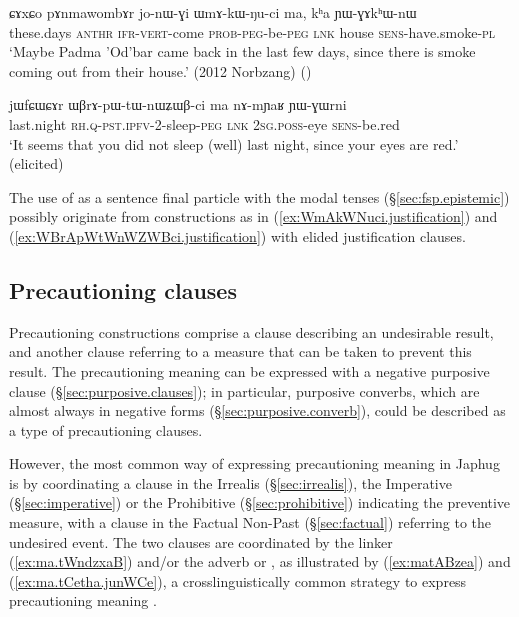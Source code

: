 \begin{exe}
\ex \label{ex:WmAkWNuci.justification}
 \gll ɕɤxɕo pɤnmawombɤr jo-nɯ-ɣi ɯmɤ-kɯ-ŋu-ci ma, kʰa ɲɯ-ɣɤkʰɯ-nɯ \\
these.days  \textsc{anthr} \textsc{ifr}-\textsc{vert}-come \textsc{prob}-\textsc{peg}-be-\textsc{peg} \textsc{lnk} house \textsc{sens}-have.smoke-\textsc{pl} \\
\glt `Maybe Padma 'Od'bar came back in the last few days, since there is smoke coming out from their house.' (2012 Norbzang)
()
\end{exe} 

 \begin{exe}
\ex \label{ex:WBrApWtWnWZWBci.justification}
 \gll  jɯfɕɯɕɤr ɯβrɤ-pɯ-tɯ-nɯʑɯβ-ci ma nɤ-mɲaʁ ɲɯ-ɣɯrni \\
 last.night \textsc{rh}.\textsc{q}-\textsc{pst}.\textsc{ipfv}-2-sleep-\textsc{peg} \textsc{lnk} \textsc{2sg}.\textsc{poss}-eye \textsc{sens}-be.red \\
 \glt `It seems that you did not sleep (well) last night, since your eyes are red.' (elicited)
\end{exe} 

 The use of  as a sentence final particle with the modal tenses (§\ref{sec:fsp.epistemic}) possibly originate from constructions as in (\ref{ex:WmAkWNuci.justification}) and (\ref{ex:WBrApWtWnWZWBci.justification}) with elided justification clauses.
 
\subsection{Precautioning clauses} \label{sec:precautioning.clauses} 
Precautioning constructions comprise a clause describing an undesirable result, and another clause referring to a measure that can be taken to prevent this result. The precautioning meaning can be expressed with a negative purposive clause (§\ref{sec:purposive.clauses}); in particular, purposive converbs, which are almost always in negative forms (§\ref{sec:purposive.converb}), could be described as a type of precautioning clauses.

However, the most common way of expressing precautioning meaning in Japhug is by coordinating a clause in the Irrealis (§\ref{sec:irrealis}), the Imperative (§\ref{sec:imperative}) or the Prohibitive (§\ref{sec:prohibitive}) indicating the preventive measure, with a clause in the Factual Non-Past (§\ref{sec:factual}) referring to the undesired event. The two clauses are coordinated by the linker  (\ref{ex:ma.tWndzxaB}) and/or the adverb  or , as illustrated by (\ref{ex:matABzea}) and (\ref{ex:ma.tCetha.junWCe}), a crosslinguistically common strategy to express precautioning meaning \citep{angelo16beware}.

